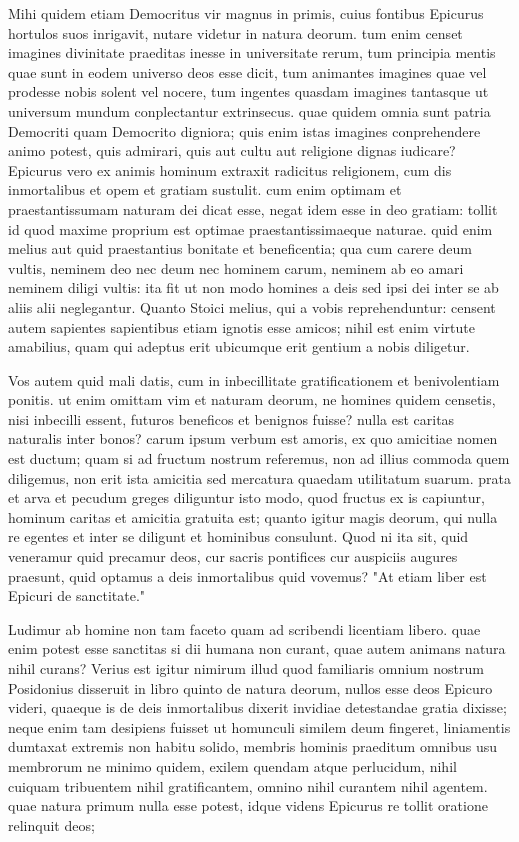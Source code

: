 
 Mihi quidem etiam Democritus vir magnus in primis, cuius fontibus Epicurus hortulos suos inrigavit, nutare videtur in natura deorum. tum enim censet imagines divinitate praeditas inesse in universitate rerum, tum principia mentis quae sunt in eodem universo deos esse dicit, tum animantes imagines quae vel prodesse nobis solent vel nocere, tum ingentes quasdam imagines tantasque ut universum mundum conplectantur extrinsecus. quae quidem omnia sunt patria Democriti quam Democrito digniora; quis enim istas imagines conprehendere animo potest, quis admirari, quis aut cultu aut religione dignas iudicare? Epicurus vero ex animis hominum extraxit radicitus religionem, cum dis inmortalibus et opem et gratiam sustulit. cum enim optimam et praestantissumam naturam dei dicat esse, negat idem esse in deo gratiam: tollit id quod maxime proprium est optimae praestantissimaeque naturae. quid enim melius aut quid praestantius bonitate et beneficentia; qua cum carere deum vultis, neminem deo nec deum nec hominem carum, neminem ab eo amari neminem diligi vultis: ita fit ut non modo homines a deis sed ipsi dei inter se ab aliis alii neglegantur. Quanto Stoici melius, qui a vobis reprehenduntur: censent autem sapientes sapientibus etiam ignotis esse amicos; nihil est enim virtute amabilius, quam qui adeptus erit ubicumque erit gentium a nobis diligetur.

 Vos autem quid mali datis, cum in inbecillitate gratificationem et benivolentiam ponitis. ut enim omittam vim et naturam deorum, ne homines quidem censetis, nisi inbecilli essent, futuros beneficos et benignos fuisse? nulla est caritas naturalis inter bonos? carum ipsum verbum est amoris, ex quo amicitiae nomen est ductum; quam si ad fructum nostrum referemus, non ad illius commoda quem diligemus, non erit ista amicitia sed mercatura quaedam utilitatum suarum. prata et arva et pecudum greges diliguntur isto modo, quod fructus ex is capiuntur, hominum caritas et amicitia gratuita est; quanto igitur magis deorum, qui nulla re egentes et inter se diligunt et hominibus consulunt. Quod ni ita sit, quid veneramur quid precamur deos, cur sacris pontifices cur auspiciis augures praesunt, quid optamus a deis inmortalibus quid vovemus? "At etiam liber est Epicuri de sanctitate."

 Ludimur ab homine non tam faceto quam ad scribendi licentiam libero. quae enim potest esse sanctitas si dii humana non curant, quae autem animans natura nihil curans? Verius est igitur nimirum illud quod familiaris omnium nostrum Posidonius disseruit in libro quinto de natura deorum, nullos esse deos Epicuro videri, quaeque is de deis inmortalibus dixerit invidiae detestandae gratia dixisse; neque enim tam desipiens fuisset ut homunculi similem deum fingeret, liniamentis dumtaxat extremis non habitu solido, membris hominis praeditum omnibus usu membrorum ne minimo quidem, exilem quendam atque perlucidum, nihil cuiquam tribuentem nihil gratificantem, omnino nihil curantem nihil agentem. quae natura primum nulla esse potest, idque videns Epicurus re tollit oratione relinquit deos;


